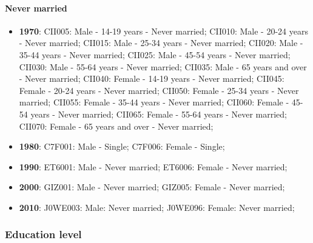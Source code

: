 \documentclass[a4paper]{article}
\begin{document}
\paragraph{Never married}
\begin{itemize}
   \item{\textbf{1970}:  CII005: Male - 14-19 years - Never married; CII010: Male - 20-24 years - Never married; CII015: Male - 25-34 years - Never married; CII020: Male - 35-44 years - Never married; CII025: Male - 45-54 years - Never married; CII030: Male - 55-64 years - Never married; CII035: Male - 65 years and over - Never married; CII040: Female - 14-19 years - Never married; CII045: Female - 20-24 years - Never married; CII050: Female - 25-34 years - Never married; CII055: Female - 35-44 years - Never married; CII060: Female - 45-54 years - Never married; CII065: Female - 55-64 years - Never married; CII070: Female - 65 years and over - Never married;}
   \item{\textbf{1980}:  C7F001: Male - Single; C7F006: Female - Single;}
   \item{\textbf{1990}:  ET6001: Male - Never married; ET6006: Female - Never married;}
   \item{\textbf{2000}:  GIZ001: Male - Never married; GIZ005: Female - Never married;}
   \item{\textbf{2010}:  J0WE003: Male: Never married; J0WE096: Female: Never married;}
\end{itemize}

\subsubsection{Education level}
\end{document}

